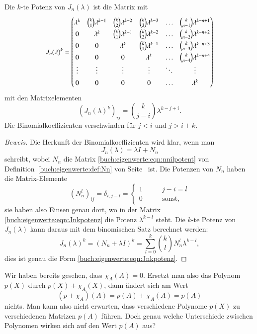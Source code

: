 \begin{satz}
Die $k$-te Potenz von $J_n(\lambda)$ ist die Matrix mit
\begin{equation}
J_n(\lambda)^k
=
\renewcommand{\arraystretch}{1.4}
\begin{pmatrix}
\lambda^k
	& \binom{k}{1}\lambda^{k-1}
		& \binom{k}{2} \lambda^{k-2}
			& \binom{k}{3} \lambda^{k-3}
				& \dots
					&\binom{k}{n-1}\lambda^{k-n+1}
\\
0
	& \lambda^k
		& \binom{k}{1}\lambda^{k-1}
			& \binom{k}{2} \lambda^{k-2}
				& \dots
					&\binom{k}{n-2}\lambda^{k-n+2}
\\
0
	& 0
		& \lambda^k
			& \binom{k}{1}\lambda^{k-1}
				& \dots
					&\binom{k}{n-3}\lambda^{k-n+3}
\\
0
	& 0
		& 0
			& \lambda^k
				& \dots
					&\binom{k}{n-4}\lambda^{k-n+4}
\\
\vdots  &\vdots &\vdots &\vdots &\ddots & \vdots
\\
0	& 0	& 0	& 0	& \dots	& \lambda^k
\end{pmatrix}
\label{buch:eigenwerte:eqn:Jnkpotenz}
\end{equation}
mit den Matrixelementen
\[
(J_n(\lambda)^k)_{i\!j}
=
\binom{k}{j-i}\lambda^{k-j+i}.
\]
Die Binomialkoeffizienten verschwinden für $j<i$ und $j>i+k$.
\end{satz}

\begin{proof}[Beweis]
Die Herkunft der Binomialkoeffizienten wird klar, wenn man
\[
J_n(\lambda) = \lambda I + N_n
\]
schreibt, wobei $N_n$ die Matrix \eqref{buch:eigenwerte:eqn:nnilpotent}
von Definition~\ref{buch:eigenwerte:def:Nn} von
Seite~\pageref{buch:eigenwerte:def:Nn} ist.
Die Potenzen von $N_n$ haben die Matrix-Elemente
\[
(N_n^l)_{i\!j}
=
\delta_{i,j-l}
=
\begin{cases}
1&\qquad j-i=l\\
0&\qquad\text{sonst,}
\end{cases}
\]
sie haben also Einsen genau dort, wo in der
Matrix 
\eqref{buch:eigenwerte:eqn:Jnkpotenz} die Potenz $\lambda^{k-l}$ steht.
Die $k$-te Potenz von $J_n(\lambda)$ kann daraus mit dem binomischen
Satz berechnet werden:
\[
J_n(\lambda)^k
=
(N_n+\lambda I)^k
=
\sum_{l=0}^k \binom{k}{l} N_n^{l} \lambda^{k-l},
\]
dies ist genau die Form \eqref{buch:eigenwerte:eqn:Jnkpotenz}.
\end{proof}

Wir haben bereits gesehen, dass $\chi_A(A)=0$.
Ersetzt man also das
Polynom $p(X)$ durch $p(X)+\chi_A(X)$, dann ändert sich am Wert 
\[
(p+\chi_A)(A)
=
p(A) + \chi_A(A)
=
p(A)
\]
nichts.
Man kann also nicht erwarten, dass verschiedene Polynome 
$p(X)$ zu verschiedenen Matrizen $p(A)$ führen.
Doch genau welche Unterschiede zwischen Polynomen wirken sich
auf den Wert $p(A)$ aus?

